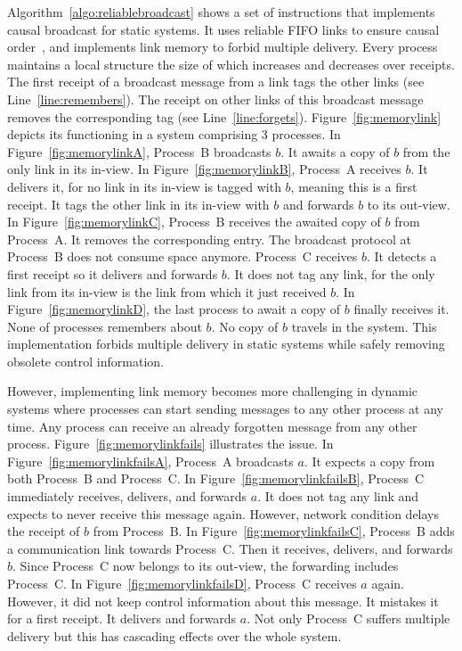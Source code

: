 Algorithm~\ref{algo:reliablebroadcast} shows a set of instructions that
implements causal broadcast for static systems. It uses reliable FIFO links to
ensure causal order~\cite{friedman2004causal}, and implements link memory
to forbid multiple delivery. Every process maintains a local structure the size
of which increases and decreases over receipts.  The first receipt of a
broadcast message from a link tags the other links (see
Line~\ref{line:remembers}). The receipt on other links of this broadcast message
removes the corresponding tag (see
Line~\ref{line:forgets}). Figure~\ref{fig:memorylink} depicts its functioning in
a system comprising 3 processes. In Figure~\ref{fig:memorylinkA}, Process~B
broadcasts $b$. It awaits a copy of $b$ from the only link in its in-view. In
Figure~\ref{fig:memorylinkB}, Process~A receives $b$. It delivers it, for no
link in its in-view is tagged with $b$, meaning this is a first receipt. It tags
the other link in its in-view with $b$ and forwards $b$ to its out-view. In
Figure~\ref{fig:memorylinkC}, Process~B receives the awaited copy of $b$ from
Process~A. It removes the corresponding entry. The broadcast protocol at
Process~B does not consume space anymore. Process~C receives $b$. It detects a
first receipt so it delivers and forwards $b$. It does not tag any link, for the
only link from its in-view is the link from which it just received $b$. In
Figure~\ref{fig:memorylinkD}, the last process to await a copy of $b$ finally
receives it. None of processes remembers about $b$. No copy of $b$ travels in
the system. This implementation forbids multiple delivery in static systems
while safely removing obsolete control information.



However, implementing link memory becomes more challenging in dynamic
systems where processes can start sending messages to any other process at any
time. Any process can receive an already forgotten message from any other
process. Figure~\ref{fig:memorylinkfails} illustrates the issue. In
Figure~\ref{fig:memorylinkfailsA}, Process~A broadcasts $a$. It expects a copy
from both Process~B and Process~C. In Figure~\ref{fig:memorylinkfailsB},
Process~C immediately receives, delivers, and forwards $a$. It does not tag any
link and expects to never receive this message again. However, network condition
delays the receipt of $b$ from Process~B. In Figure~\ref{fig:memorylinkfailsC},
Process~B adds a communication link towards Process~C. Then it receives,
delivers, and forwards $b$. Since Process~C now belongs to its out-view, the
forwarding includes Process~C. In Figure~\ref{fig:memorylinkfailsD}, Process~C
receives $a$ again. However, it did not keep control information about this
message. It mistakes it for a first receipt. It delivers and forwards $a$. Not
only Process~C suffers multiple delivery but this has cascading effects over the
whole system.

